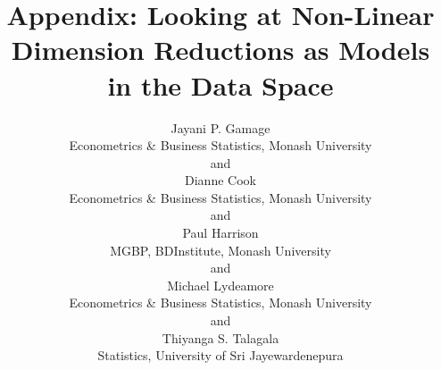 \documentclass[
  12pt]{article}
\begin{document}
\def\spacingset#1{\renewcommand{\baselinestretch}%
{#1}\small\normalsize} \spacingset{1}



\title{\bf Appendix: Looking at Non-Linear Dimension Reductions as
Models in the Data Space}
\author{
Jayani P. Gamage\\
Econometrics \& Business Statistics, Monash University\\
and\\Dianne Cook\\
Econometrics \& Business Statistics, Monash University\\
and\\Paul Harrison\\
MGBP, BDInstitute, Monash University\\
and\\Michael Lydeamore\\
Econometrics \& Business Statistics, Monash University\\
and\\Thiyanga S. Talagala\\
Statistics, University of Sri Jayewardenepura\\
}
\maketitle

\bigskip
\bigskip
\begin{abstract}

\end{abstract}


\newpage
\spacingset{1.9} %
\end{document}
